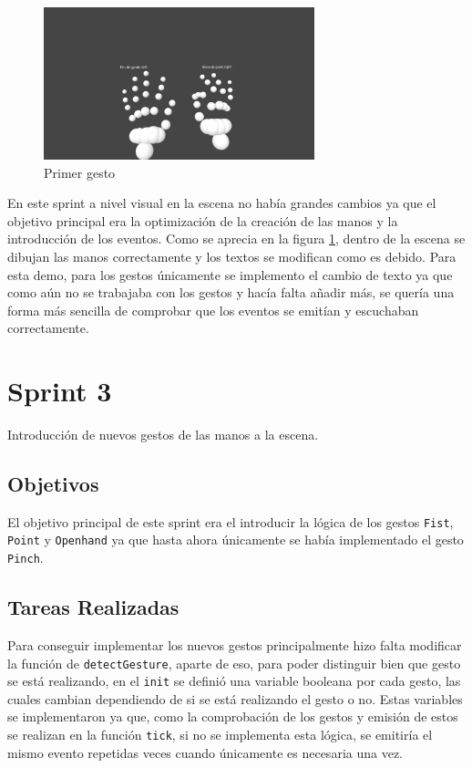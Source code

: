 \documentclass[a4paper, 12pt]{book}
\begin{document}
\begin{figure}[H] 
  \centering
  \includegraphics[width=0.7\textwidth]{img/primer_gesto.jpg}
  \caption{Primer gesto}
  \label{fig:sprint2}
\end{figure}

En este sprint a nivel visual en la escena no había grandes cambios ya que el objetivo principal era la optimización de la creación de las manos y la introducción de los eventos. 
Como se aprecia en la figura \ref{fig:sprint2}, dentro de la escena se dibujan las manos correctamente y los textos se modifican como es debido. Para esta demo, para los gestos únicamente se implemento el cambio de texto ya que 
como aún no se trabajaba con los gestos y hacía falta añadir más, se quería una forma más sencilla de comprobar que los eventos se emitían y escuchaban correctamente. 

\section{Sprint 3}
\label{sec:sprint3}
Introducción de nuevos gestos de las manos a la escena.

\subsection{Objetivos}
\label{subsec:objetivo-principal3}
El objetivo principal de este sprint era el introducir la lógica de los gestos \texttt{Fist}, \texttt{Point} y \texttt{Openhand} ya que hasta ahora únicamente se había implementado el gesto \texttt{Pinch}.

\subsection{Tareas Realizadas}
\label{subsec:implementacion3}
Para conseguir implementar los nuevos gestos principalmente hizo falta modificar la función de \texttt{detectGesture}, aparte de eso, para poder distinguir bien que gesto se está realizando, en el \texttt{init} se definió una variable booleana por cada gesto, las cuales cambian dependiendo de si se está realizando el gesto o no. Estas variables se implementaron ya que, como la comprobación de los gestos y emisión de estos se realizan en la función \texttt{tick}, si no se implementa esta lógica, se emitiría el mismo evento repetidas veces cuando únicamente es necesaria una vez.
\end{document}
